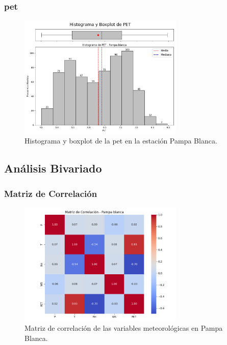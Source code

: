 \subsubsection*{\gls{pet} }
\begin{figure}[htbp]
\centering
\includegraphics[width=0.7\textwidth]{resultados/por_estacion_meteorologica/Pampa_Blanca/PET_histograma.png}
\caption{Histograma y boxplot de la \gls{pet}  en la estación Pampa Blanca.}
\label{fig:pampablanca_PET}
\end{figure}

\subsection{Análisis Bivariado}

\subsubsection*{Matriz de Correlación}
\begin{figure}[htbp]
\centering
\includegraphics[width=0.7\textwidth]{resultados/por_estacion_meteorologica/Pampa_Blanca/matriz_correlacion.png}
\caption{Matriz de correlación de las variables meteorológicas en Pampa Blanca.}
\label{fig:pampablanca_corr}
\end{figure}

